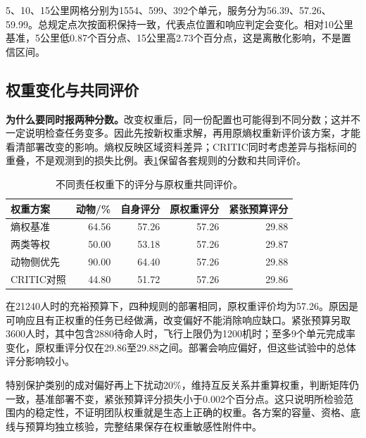 \documentclass[12pt,a4paper]{article}
\numberwithin{equation}{section}
\begin{document}
5、10、15公里网格分别为1554、599、392个单元，服务分为56.39、57.26、59.99。总规定点次按面积保持一致，代表点位置和响应判定会变化。相对10公里基准，5公里低0.87个百分点、15公里高2.73个百分点，这是离散化影响，不是置信区间。

\subsection{权重变化与共同评价}
\noindent\textbf{为什么要同时报两种分数。}改变权重后，同一份配置也可能得到不同分数；这并不一定说明检查任务变多。因此先按新权重求解，再用原熵权重新评价该方案，才能看清部署改变的影响。熵权反映区域资料差异；CRITIC同时考虑差异与指标间的重叠，不是观测到的损失比例。表\ref{tab:weights}保留各套规则的分数和共同评价。

\begin{table}[H]
\centering\normalsize
\caption{不同责任权重下的评分与原权重共同评价。}
\label{tab:weights}
\begin{tabular}{lrrrr}
\toprule
权重方案 & 动物/\% & 自身评分 & 原权重评分 & 紧张预算评分 \\
\midrule
熵权基准 & 64.56 & 57.26 & 57.26 & 29.88 \\
两类等权 & 50.00 & 53.18 & 57.26 & 29.87 \\
动物侧优先 & 90.00 & 64.40 & 57.26 & 29.88 \\
CRITIC对照 & 44.80 & 51.72 & 57.26 & 29.86 \\
\bottomrule
\end{tabular}
\end{table}

在21240人时的充裕预算下，四种规则的部署相同，原权重评价均为57.26。原因是可响应且有正权重的任务已经做满，改变偏好不能消除响应缺口。紧张预算另取3600人时，其中包含2880待命人时，飞行上限仍为1200机时；至多9个单元完成率变化，原权重评分仅在29.86至29.88之间。部署会响应偏好，但这些试验中的总体评分影响较小。

特别保护类别的成对偏好再上下扰动20\%，维持互反关系并重算权重，判断矩阵仍一致，基准部署不变，紧张预算评分损失小于0.002个百分点。这只说明所检验范围内的稳定性，不证明团队权重就是生态上正确的权重。各方案的容量、资格、底线与预算均独立核验，完整结果保存在权重敏感性附件中。
\end{document}
